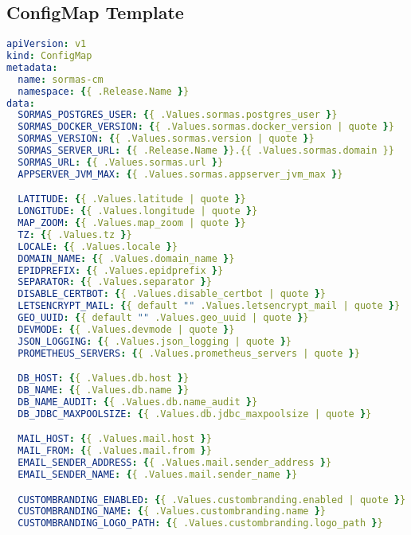 \subsection{ConfigMap Template}
\hfill \newline
\label{app:configmap_template}
\begin{lstlisting}[language=yaml]
apiVersion: v1
kind: ConfigMap
metadata:
  name: sormas-cm
  namespace: {{ .Release.Name }}
data:
  SORMAS_POSTGRES_USER: {{ .Values.sormas.postgres_user }}
  SORMAS_DOCKER_VERSION: {{ .Values.sormas.docker_version | quote }}
  SORMAS_VERSION: {{ .Values.sormas.version | quote }}
  SORMAS_SERVER_URL: {{ .Release.Name }}.{{ .Values.sormas.domain }}
  SORMAS_URL: {{ .Values.sormas.url }}
  APPSERVER_JVM_MAX: {{ .Values.sormas.appserver_jvm_max }}

  LATITUDE: {{ .Values.latitude | quote }}
  LONGITUDE: {{ .Values.longitude | quote }}
  MAP_ZOOM: {{ .Values.map_zoom | quote }}
  TZ: {{ .Values.tz }}
  LOCALE: {{ .Values.locale }}
  DOMAIN_NAME: {{ .Values.domain_name }}
  EPIDPREFIX: {{ .Values.epidprefix }}
  SEPARATOR: {{ .Values.separator }}
  DISABLE_CERTBOT: {{ .Values.disable_certbot | quote }}
  LETSENCRYPT_MAIL: {{ default "" .Values.letsencrypt_mail | quote }}
  GEO_UUID: {{ default "" .Values.geo_uuid | quote }}
  DEVMODE: {{ .Values.devmode | quote }}
  JSON_LOGGING: {{ .Values.json_logging | quote }}
  PROMETHEUS_SERVERS: {{ .Values.prometheus_servers | quote }}

  DB_HOST: {{ .Values.db.host }}
  DB_NAME: {{ .Values.db.name }}
  DB_NAME_AUDIT: {{ .Values.db.name_audit }}
  DB_JDBC_MAXPOOLSIZE: {{ .Values.db.jdbc_maxpoolsize | quote }}

  MAIL_HOST: {{ .Values.mail.host }}
  MAIL_FROM: {{ .Values.mail.from }}
  EMAIL_SENDER_ADDRESS: {{ .Values.mail.sender_address }}
  EMAIL_SENDER_NAME: {{ .Values.mail.sender_name }}

  CUSTOMBRANDING_ENABLED: {{ .Values.custombranding.enabled | quote }}
  CUSTOMBRANDING_NAME: {{ .Values.custombranding.name }}
  CUSTOMBRANDING_LOGO_PATH: {{ .Values.custombranding.logo_path }}
\end{lstlisting}